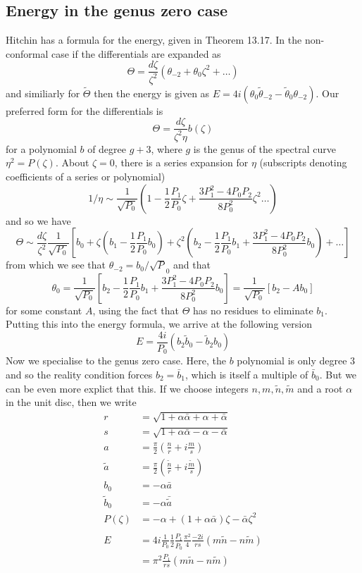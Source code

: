 \subsection{Energy in the genus zero case}
Hitchin has a formula for the energy, given in Theorem 13.17. In the non-conformal case if the differentials are expanded as
\[
\Theta = \frac{d\zeta}{\zeta^2}(\theta_{-2} + \theta_0\zeta^2 + \dots)
\]
and similiarly for $\tilde \Theta$ then the energy is given as $E = 4i(\theta_0 \tilde \theta_{-2} - \tilde \theta_0 \theta_{-2})$. Our preferred form for the differentials is
\[
  \Theta = \frac{d\zeta}{\zeta^2\eta}b(\zeta)
\]
for a polynomial $b$ of degree $g+3$, where $g$ is the genus of the spectral curve $\eta^2 = P(\zeta)$. About $\zeta=0$, there is a series expansion for $\eta$ (subscripts denoting coefficients of a series or polynomial)
\[
  1/\eta \sim \frac{1}{\sqrt{P_0}}\left(1 - \frac{1}{2}\frac{P_1}{P_0}\zeta + \frac{3P_1^2 - 4P_0P_2}{8P_0^2}\zeta^2\dots\right)
\]
and so we have
\[
  \Theta \sim \frac{d\zeta}{\zeta^2}\frac{1}{\sqrt{P_0}}\left[ b_0 + \zeta\left( b_1 - \frac{1}{2}\frac{P_1}{P_0}b_0 \right) + \zeta^2\left( b_2 - \frac{1}{2}\frac{P_1}{P_0}b_1 + \frac{3P_1^2 - 4P_0P_2}{8P_0^2}b_0 \right) + \dots\right]
\]
from which we see that $\theta_{-2} = b_0 / \sqrt P_0$ and that
\[
  \theta_0 = \frac{1}{\sqrt{P_0}}\left[b_2 - \frac{1}{2}\frac{P_1}{P_0}b_1 + \frac{3P_1^2 - 4P_0P_2}{8P_0^2}b_0\right] = \frac{1}{\sqrt{P_0}}\left[b_2 - A b_0\right]
\]
for some constant $A$, using the fact that $\Theta$ has no residues to eliminate $b_1$. Putting this into the energy formula, we arrive at the following version
\[
  E = \frac{4i}{P_0} (b_2 \tilde b_0 - \tilde b_2 b_0)
\]
Now we specialise to the genus zero case. Here, the $b$ polynomial is only degree $3$ and so the reality condition forces $b_2 = \bar b_1$, which is itself a multiple of $\bar b_0$. But we can be even more explict that this. If we choose integers $n,m,\tilde n, \tilde m$ and a root $\alpha$ in the unit disc, then we write
\begin{align*}
r &= \sqrt{ 1 + \alpha\bar \alpha + \alpha + \bar \alpha} \\
s &= \sqrt{ 1 + \alpha\bar \alpha - \alpha - \bar \alpha} \\
a &= \frac{\pi}{2}\left( \frac{n}{r} + i\frac{m}{s} \right) \\
\tilde a &= \frac{\pi}{2}\left( \frac{\tilde n}{r} + i\frac{\tilde m}{s} \right)\\
b_0 &= - \alpha \bar a \\
\tilde b_0 &= - \alpha \bar{\tilde a} \\
P(\zeta) &= -\alpha + (1+\alpha\bar \alpha)\zeta - \bar \alpha\zeta^2 \\
& \\
E &= 4i \frac{1}{P_0}\frac{1}{2}\frac{P_1}{\overline P_0}\frac{\pi^2}{4}\frac{-2i}{rs}(m\tilde n - n\tilde m) \\
&= \pi^2\frac{P_1}{rs}(m\tilde n - n\tilde m)
\end{align*}
